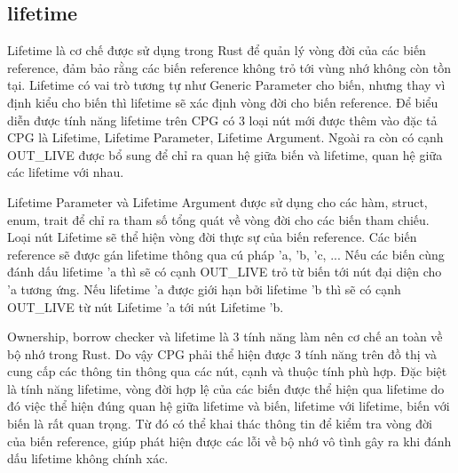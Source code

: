 \subsection{lifetime}

Lifetime là cơ chế được sử dụng trong Rust để quản lý vòng đời của các biến reference, đảm bảo rằng các biến reference không trỏ tới vùng nhớ không còn tồn tại. Lifetime có vai trò tương tự như Generic Parameter cho biến, nhưng thay vì định kiểu cho biến thì lifetime sẽ xác định vòng đời cho biến reference. Để biểu diễn được tính năng lifetime trên CPG có 3 loại nút mới được thêm vào đặc tả CPG là Lifetime, Lifetime Parameter, Lifetime Argument.
Ngoài ra còn có cạnh OUT\_LIVE được bổ sung để chỉ ra quan hệ giữa biến và lifetime, quan hệ giữa các lifetime với nhau.

Lifetime Parameter và Lifetime Argument được sử dụng cho các hàm, struct, enum, trait để chỉ ra tham số tổng quát về vòng đời cho các biến tham chiếu. Loại nút Lifetime sẽ thể hiện vòng đời thực sự của biến reference. Các biến reference sẽ được gán lifetime thông qua cú pháp 'a, 'b, 'c, ... Nếu các biến cùng đánh dấu lifetime 'a thì sẽ có cạnh OUT\_LIVE trỏ từ biến tới nút đại diện cho 'a tương ứng. Nếu lifetime 'a được giới hạn bởi lifetime 'b thì sẽ có cạnh OUT\_LIVE từ nút Lifetime 'a tới nút Lifetime 'b.

Ownership, borrow checker và lifetime là 3 tính năng làm nên cơ chế an toàn về bộ nhớ trong Rust. Do vậy CPG phải thể hiện được 3 tính năng trên đồ thị và cung cấp các thông tin thông qua các nút, cạnh và thuộc tính phù hợp. Đặc biệt là tính năng lifetime, vòng đời hợp lệ của các biến được thể hiện qua lifetime do đó việc thể hiện đúng quan hệ giữa lifetime và biến, lifetime với lifetime, biến với biến là rất quan trọng. Từ đó có thể khai thác thông tin để kiểm tra vòng đời của biến reference, giúp phát hiện được các lỗi về bộ nhớ vô tình gây ra khi đánh dấu lifetime không chính xác.


